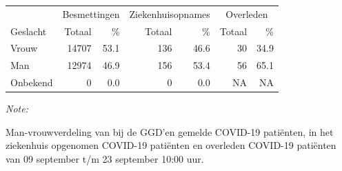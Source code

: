 \documentclass[
  english,
  man,floatsintext]{apa6}
\begin{document}
\begin{table}
\centering\begingroup\fontsize{11}{13}\selectfont

\begin{threeparttable}
\begin{tabular}{lrrrrrr}
\toprule
\multicolumn{1}{c}{ } & \multicolumn{2}{c}{Besmettingen} & \multicolumn{2}{c}{Ziekenhuisopnames} & \multicolumn{2}{c}{Overleden} \\
\cmidrule(l{3pt}r{3pt}){2-3} \cmidrule(l{3pt}r{3pt}){4-5} \cmidrule(l{3pt}r{3pt}){6-7}
Geslacht & Totaal & \% & Totaal & \% & Totaal & \%\\
\midrule
Vrouw & 14707 & 53.1 & 136 & 46.6 & 30 & 34.9\\
Man & 12974 & 46.9 & 156 & 53.4 & 56 & 65.1\\
Onbekend & 0 & 0.0 & 0 & 0.0 & NA & NA\\
\bottomrule
\end{tabular}
\begin{tablenotes}
\item \textit{Note: } 
\item Man-vrouwverdeling van bij de GGD’en gemelde COVID-19 patiënten, in het ziekenhuis opgenomen COVID-19 patiënten en overleden COVID-19 patiënten van 09 september t/m 23 september 10:00 uur.
\end{tablenotes}
\end{threeparttable}
\endgroup{}
\end{table}
\newpage
\end{document}
